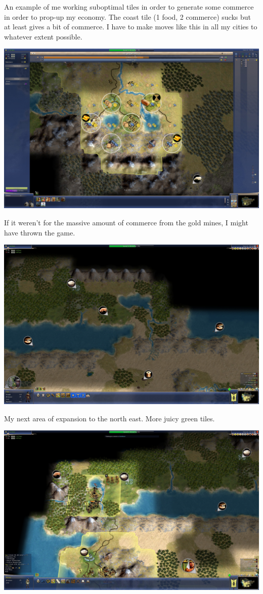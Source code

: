 \documentclass[10pt]{article}
\begin{document}
An example of me working suboptimal tiles in order to generate some commerce in order to prop-up my
economy. The coast tile (1 food, 2 commerce) sucks but at least gives a bit of commerce. I have to make
moves like this in all my cities to whatever extent possible.

\includegraphics[width=1.0\textwidth]{68}

If it weren't for the massive amount of commerce from the gold mines, I might have thrown the game.

\includegraphics[width=1.0\textwidth]{70}

My next area of expansion to the north east. More juicy green tiles.

\includegraphics[width=1.0\textwidth]{71}
\end{document}
